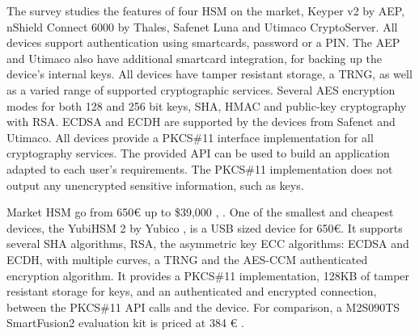 The survey \cite{ivarsson2010review} studies the features of four \ac{HSM} on the market, Keyper v2 by AEP, nShield Connect 6000 by Thales, Safenet Luna and Utimaco CryptoServer.
All devices support authentication using smartcards, password or a PIN. The AEP and Utimaco also have additional smartcard integration, for backing up the device's internal keys.
All devices have tamper resistant storage, a \ac{TRNG}, as well as a varied range of supported cryptographic services. Several AES encryption modes for both 128 and 256 bit keys, SHA, HMAC and public-key cryptography with RSA.
ECDSA and ECDH are supported by the devices from Safenet and Utimaco.
All devices provide a PKCS\#11 interface implementation for all cryptography services. The provided API can be used to build an application adapted to each user's requirements. The PKCS\#11 implementation does not output any unencrypted sensitive information, such as keys.

Market \ac{HSM} go from 650€ up to \$39,000 \cite{HSMpriceArticles}, \cite{HSMPresentationPrices}.
One of the smallest and cheapest devices, the YubiHSM 2 by Yubico \cite{YubiHSM2}, is a \ac{USB} sized device for 650€. It supports several SHA algorithms, RSA, the asymmetric key ECC algorithms: ECDSA and ECDH, with multiple curves, a \ac{TRNG} and the \ac{AES}-\ac{CCM} authenticated encryption algorithm.
It provides a PKCS\#11 implementation, 128KB of tamper resistant storage for keys, and an authenticated and encrypted connection, between the PKCS\#11 API calls and the device.
For comparison, a M2S090TS SmartFusion2 evaluation kit is priced at 384 € \cite{smartfusionPrice}.

